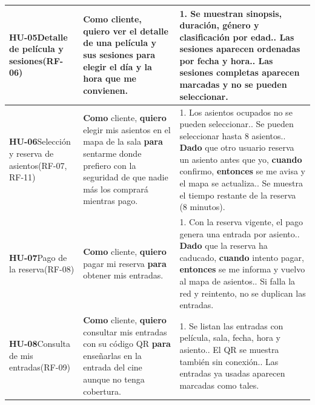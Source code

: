 \documentclass[11pt,a4paper]{article}
\begin{document}
\begin{longtable}{L{2.4cm} L{6.4cm} L{4.9cm}}
\midrule
\textbf{HU-05}\newline Detalle de película y sesiones\newline\small(RF-06) & \textbf{Como} cliente, \textbf{quiero} ver el detalle de una película y sus sesiones \textbf{para} elegir el día y la hora que me convienen. & 1. Se muestran sinopsis, duración, género y clasificación por edad.. Las sesiones aparecen ordenadas por fecha y hora.. Las sesiones completas aparecen marcadas y no se pueden seleccionar. \\
\midrule
\textbf{HU-06}\newline Selección y reserva de asientos\newline\small(RF-07, RF-11) & \textbf{Como} cliente, \textbf{quiero} elegir mis asientos en el mapa de la sala \textbf{para} sentarme donde prefiero con la seguridad de que nadie más los comprará mientras pago. & 1. Los asientos ocupados no se pueden seleccionar.. Se pueden seleccionar hasta 8 asientos.. \textbf{Dado} que otro usuario reserva un asiento antes que yo, \textbf{cuando} confirmo, \textbf{entonces} se me avisa y el mapa se actualiza.. Se muestra el tiempo restante de la reserva (8 minutos). \\
\midrule
\textbf{HU-07}\newline Pago de la reserva\newline\small(RF-08) & \textbf{Como} cliente, \textbf{quiero} pagar mi reserva \textbf{para} obtener mis entradas. & 1. Con la reserva vigente, el pago genera una entrada por asiento.. \textbf{Dado} que la reserva ha caducado, \textbf{cuando} intento pagar, \textbf{entonces} se me informa y vuelvo al mapa de asientos.. Si falla la red y reintento, no se duplican las entradas. \\
\midrule
\textbf{HU-08}\newline Consulta de mis entradas\newline\small(RF-09) & \textbf{Como} cliente, \textbf{quiero} consultar mis entradas con su código QR \textbf{para} enseñarlas en la entrada del cine aunque no tenga cobertura. & 1. Se listan las entradas con película, sala, fecha, hora y asiento.. El QR se muestra también sin conexión.. Las entradas ya usadas aparecen marcadas como tales. \\

\end{longtable}
\end{document}
